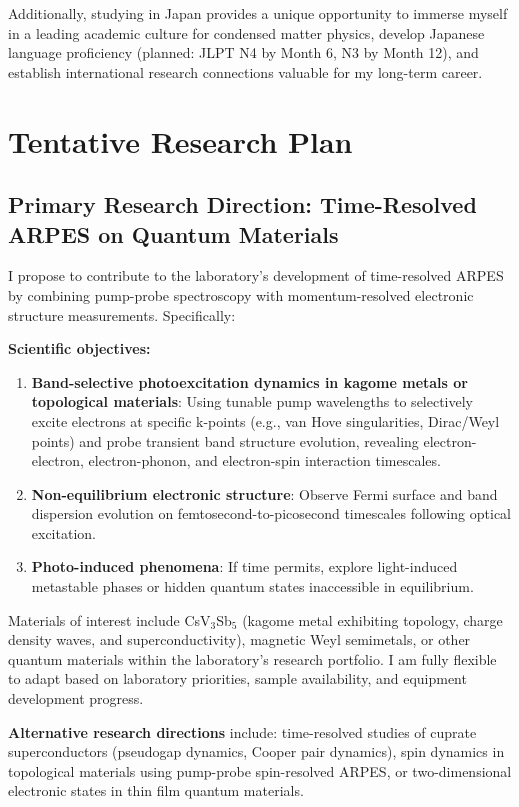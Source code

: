 \documentclass[11pt,a4paper]{article}
\begin{document}
Additionally, studying in Japan provides a unique opportunity to immerse myself in a leading academic culture for condensed matter physics, develop Japanese language proficiency (planned: JLPT N4 by Month 6, N3 by Month 12), and establish international research connections valuable for my long-term career.

\section{Tentative Research Plan}

\subsection{Primary Research Direction: Time-Resolved ARPES on Quantum Materials}

I propose to contribute to the laboratory's development of time-resolved ARPES by combining pump-probe spectroscopy with momentum-resolved electronic structure measurements. Specifically:

\textbf{Scientific objectives:}
\begin{enumerate}
    \item \textbf{Band-selective photoexcitation dynamics in kagome metals or topological materials}: Using tunable pump wavelengths to selectively excite electrons at specific k-points (e.g., van Hove singularities, Dirac/Weyl points) and probe transient band structure evolution, revealing electron-electron, electron-phonon, and electron-spin interaction timescales.
    
    \item \textbf{Non-equilibrium electronic structure}: Observe Fermi surface and band dispersion evolution on femtosecond-to-picosecond timescales following optical excitation.
    
    \item \textbf{Photo-induced phenomena}: If time permits, explore light-induced metastable phases or hidden quantum states inaccessible in equilibrium.
\end{enumerate}

Materials of interest include CsV$_3$Sb$_5$ (kagome metal exhibiting topology, charge density waves, and superconductivity), magnetic Weyl semimetals, or other quantum materials within the laboratory's research portfolio. I am fully flexible to adapt based on laboratory priorities, sample availability, and equipment development progress.

\textbf{Alternative research directions} include: time-resolved studies of cuprate superconductors (pseudogap dynamics, Cooper pair dynamics), spin dynamics in topological materials using pump-probe spin-resolved ARPES, or two-dimensional electronic states in thin film quantum materials.
\end{document}
